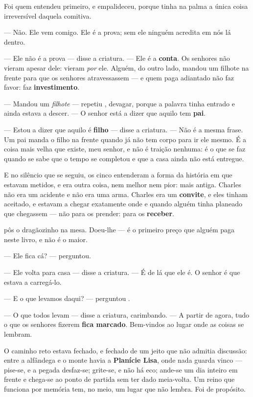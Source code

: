 \documentclass[livro.tex]{subfiles}
\begin{document}
\medskip

Foi \Joa quem entendeu primeiro, e empalideceu, porque tinha na palma a única coisa irreversível
daquela comitiva.

--- Não. Ele vem comigo. Ele é a prova; sem ele ninguém acredita em nós lá dentro.

--- Ele não é a prova --- disse a criatura. --- Ele é a \textbf{conta}. Os senhores não vieram
apesar dele: vieram \emph{por} ele. Alguém, do outro lado, mandou um filhote na frente para que
os senhores atravessassem --- e quem paga adiantado não faz favor: faz \textbf{investimento}.

--- Mandou um \emph{filhote} --- repetiu \Joa , devagar, porque a palavra tinha entrado e ainda
estava a descer. --- O senhor está a dizer que aquilo tem \textbf{pai}.

--- Estou a dizer que aquilo é \textbf{filho} --- disse a criatura. --- Não é a mesma frase. Um
pai manda o filho na frente quando já não tem corpo para ir ele mesmo. É a coisa mais velha que
existe, meu senhor, e não é traição nenhuma: é o que se faz quando se sabe que o tempo se
completou e que a casa ainda não está entregue.

E no silêncio que se seguiu, os cinco entenderam a forma da história em que estavam metidos, e
era outra coisa, nem melhor nem pior: mais antiga. Charles não era um acidente e não era uma
arma. Charles era um \textbf{convite}, e eles tinham aceitado, e estavam a chegar exatamente
onde e quando alguém tinha planeado que chegassem --- não para os prender: para os
\textbf{receber}.

\Joa pôs o dragãozinho na mesa. Doeu-lhe --- é o primeiro preço que alguém paga neste livro, e
não é o maior.

--- Ele fica cá? --- perguntou.

--- Ele volta para casa --- disse a criatura. --- É de lá que ele é. O senhor é que estava a
carregá-lo.

--- E o que levamos daqui? --- perguntou \Ben .

--- O que todos levam --- disse a criatura, carimbando. --- A partir de agora, tudo o que os
senhores fizerem \textbf{fica marcado}. Bem-vindos ao lugar onde as coisas se lembram.

\medskip

O caminho reto estava fechado, e fechado de um jeito que não admitia discussão: entre a alfândega
e o monte havia a \textbf{Planície Lisa}, onde nada guarda vinco --- pise-se, e a pegada
desfaz-se; grite-se, e não há eco; ande-se um dia inteiro em frente e chega-se ao ponto de
partida sem ter dado meia-volta. Um reino que funciona por memória tem, no meio, um lugar que não
lembra. Foi de propósito.
\end{document}

